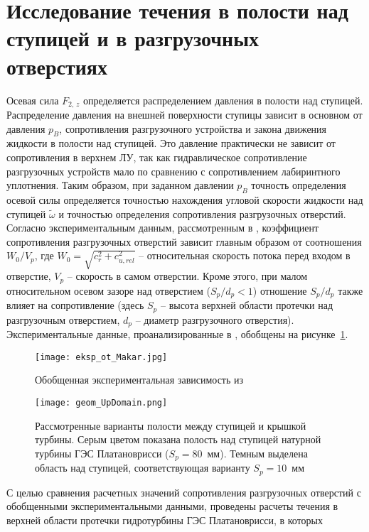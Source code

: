 \section{Исследование течения в полости над ступицей и в разгрузочных отверстиях}
\label{s:37}
Осевая сила $F_{2,\,z}$ определяется распределением давления в полости над ступицей. 
Распределение давления на внешней поверхности ступицы зависит в основном от давления $p_B$, 
сопротивления разгрузочного устройства и закона движения жидкости в полости над ступицей. Это давление 
практически не зависит от сопротивления в верхнем ЛУ, так как гидравлическое сопротивление разгрузочных 
устройств мало по сравнению с сопротивлением лабиринтного уплотнения. Таким образом, при заданном 
давлении $p_B$ точность определения осевой силы определяется точностью нахождения угловой скорости 
жидкости над ступицей $\tilde{\omega}$ и точностью определения сопротивления разгрузочных отверстий. 
Согласно экспериментальным данным, рассмотренным в \cite{makar}, коэффициент сопротивления разгрузочных 
отверстий зависит главным образом от 
соотношения $W_0 / V_p$, где $W_0 =\sqrt{c_r^2 + c_{u,rel}^2}$ -- относительная скорость потока 
перед входом в отверстие, $V_p$ -- скорость в самом отверстии. Кроме этого, при малом относительном осевом 
зазоре над  отверстием ($S_p / d_p < 1$) отношение $S_p / d_p$ также влияет на сопротивление (здесь 
$S_p$ -- высота верхней области протечки над разгрузочным отверстием, $d_p$ -- диаметр 
разгрузочного отверстия). Экспериментальные данные, проанализированные в \cite{makar}, обобщены на 
рисунке~\ref{fig3:26}. 
\begin{figure}[!t]
  \centering
  \texttt{[image: eksp\_ot\_Makar.jpg]}\\[-5mm]
  \caption{Обобщенная экспериментальная зависимость из \cite{makar}}
  \label{fig3:26}
\end{figure}
\begin{figure}[!t]
  \centering
  \texttt{[image: geom\_UpDomain.png]}\\[-5mm]
  \caption{Рассмотренные варианты полости между ступицей и крышкой турбины. Серым цветом показана 
           полость над ступицей натурной турбины ГЭС Платановрисси ($S_p = 80$~мм). Темным выделена 
           область над ступицей, соответствующая варианту $S_p = 10$~мм}
  \label{fig3:27}
\end{figure}
С целью сравнения расчетных значений сопротивления разгрузочных отверстий с обобщенными экспериментальными 
данными, проведены расчеты течения в верхней области протечки гидротурбины ГЭС Платановрисси, в которых 
